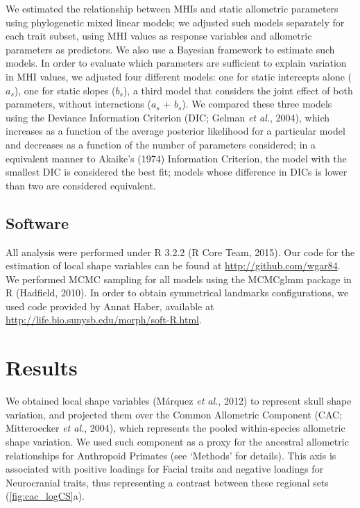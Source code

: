 \documentclass[12pt,twoside]{report}
\begin{document}
We estimated the relationship between MHIs and static allometric
parameters using phylogenetic mixed linear models; we adjusted such
models separately for each trait subset, using MHI values as response
variables and allometric parameters as predictors. We also use a
Bayesian framework to estimate such models. In order to evaluate which
parameters are sufficient to explain variation in MHI values, we
adjusted four different models: one for static intercepts alone ($a_s$),
one for static slopes ($b_s$), a third model that considers the joint
effect of both parameters, without interactions ($a_s$ + $b_s$). We
compared these three models using the Deviance Information Criterion
(DIC; Gelman \emph{et al.}, 2004), which increases as a function of the
average posterior likelihood for a particular model and decreases as a
function of the number of parameters considered; in a equivalent manner
to Akaike's (1974) Information Criterion, the model with the smallest
DIC is considered the best fit; models whose difference in DICs is lower
than two are considered equivalent.

\subsection{Software}\label{software-1}

All analysis were performed under R 3.2.2 (R Core Team, 2015). Our code
for the estimation of local shape variables can be found at
\url{http://github.com/wgar84}. We performed MCMC sampling for all
models using the MCMCglmm package in R (Hadfield, 2010). In order to
obtain symmetrical landmarks configurations, we used code provided by
Annat Haber, available at
\url{http://life.bio.sunysb.edu/morph/soft-R.html}.

\section{Results}\label{results-1}

We obtained local shape variables (Márquez \emph{et al.}, 2012) to
represent skull shape variation, and projected them over the Common
Allometric Component (CAC; Mitteroecker \emph{et al.}, 2004), which
represents the pooled within-species allometric shape variation. We used
such component as a proxy for the ancestral allometric relationships for
Anthropoid Primates (see `Methods' for details). This axis is associated
with positive loadings for Facial traits and negative loadings for
Neurocranial traits, thus representing a contrast between these regional
sets (\autoref{fig:cac_logCS}a).
\end{document}
